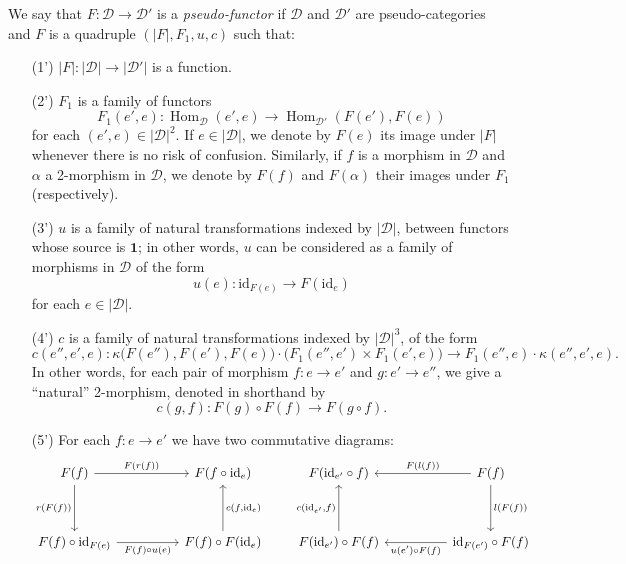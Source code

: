 \documentclass[fleqn]{article}
\newcommand{\id}{\mathrm{id}}
\newcommand{\cat}[1]{\mathcal{#1}}
\newcommand{\set}[1]{|#1|}
\DeclareMathOperator{\Hom}{Hom}
\begin{document}
We say that $F\colon\cat{D}\to\cat{D}'$ is a \emph{pseudo-functor} if $\cat{D}$ and $\cat{D}'$ are pseudo-categories and $F$ is a quadruple $(\set{F},F_1,u,c)$ such that:
\begin{enumerate}
  \item[(1')]
    $\set{F}\colon\set{\cat{D}}\to\set{\cat{D}'}$ is a function.

  \item[(2')]
    $F_1$ is a family of functors
    \[
      F_1(e',e)\colon
      \Hom_\cat{D}(e',e)
      \to \Hom_{\cat{D}'}(F(e'),F(e))
    \]
    for each $(e',e)\in\set{\cat{D}}^2$.
    If $e\in\set{\cat{D}}$, we denote by $F(e)$ its image under $\set{F}$ whenever there is no risk of confusion.
    Similarly, if $f$ is a morphism in $\cat{D}$ and $\alpha$ a 2-morphism in $\cat{D}$, we denote by $F(f)$ and $F(\alpha)$ their images under $F_1$ (respectively).

  \item[(3')]
    $u$ is a family of natural transformations indexed by $\set{\cat{D}}$, between functors whose source is $\mathbf{1}$;
    in other words, $u$ can be considered as a family of morphisms in $\cat{D}$ of the form
    \[
      u(e)\colon
      \id_{F(e)}
      \to F(\id_e)
    \]
    for each $e\in\set{\cat{D}}$.

  \item[(4')]
    $c$ is a family of natural transformations indexed by $\set{\cat{D}}^3$, of the form
    \[
        c(e'',e',e)\colon
        \kappa\big(F(e''),F(e'),F(e)\big) \cdot \big(F_1(e'',e')\times F_1(e',e)\big)
        \to F_1(e'',e)\cdot\kappa(e'',e',e).
    \]
    In other words, for each pair of morphism $f\colon e\to e'$ and $g\colon e'\to e''$, we give a ``natural'' 2-morphism, denoted in shorthand by
    \[
      c(g,f)\colon F(g)\circ F(f)
      \to F(g\circ f).
    \]

  \item[(5')]
    For each $f\colon e\to e'$ we have two commutative diagrams:
    \[
      \begin{tikzcd}[sep=huge]
        F(f)
          \ar[r,"{F(r(f))}"]
          \ar[d,swap,"{r(F(f))}"]
      & F(f\circ\id_e)
      \\F(f)\circ\id_{F(e)}
          \ar[r,swap,"{F(f)\circ u(e)}"]
      & F(f)\circ F(\id_e)
          \ar[u,swap,"{c(f,\id_e)}"]
      \end{tikzcd}
      \qquad
      \begin{tikzcd}[sep=huge]
        F(\id_{e'}\circ f)
      & F(f)
          \ar[l,swap,"{F(l(f))}"]
          \ar[d,"{l(F(f))}"]
      \\F(\id_{e'})\circ F(f)
          \ar[u,"{c(\id_{e'},f)}"]
      & \id_{F(e')}\circ F(f)
          \ar[l,"{u(e')\circ F(f)}"]
      \end{tikzcd}
    \]


\end{enumerate}
\end{document}
